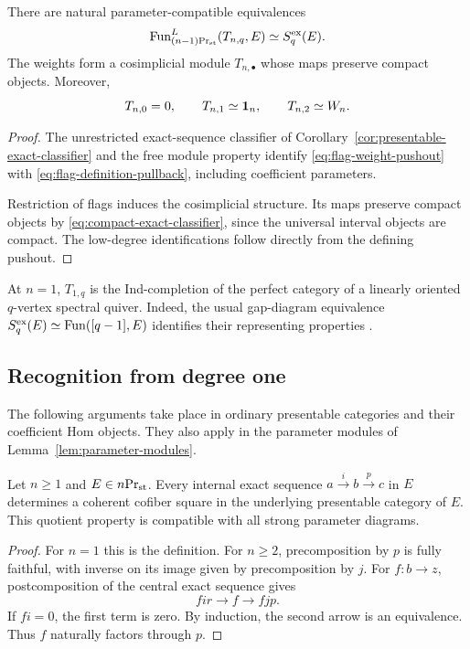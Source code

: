 \begin{proposition}\label{prop:flag-weight-up}
There are natural parameter-compatible equivalences
\begin{equation}\label{eq:flag-weight-up}
 \operatorname{Fun}^L_{{(n-1)}\mathrm{Pr}_{\mathrm{st}}}(T_{n,q},E)
       \simeq S_q^{\mathrm{ex}}(E).
\end{equation}
The weights form a cosimplicial module $T_{n,\bullet}$ whose maps
preserve compact objects. Moreover,
\[
 T_{n,0}=0,\qquad T_{n,1}\simeq\mathbf 1_n,\qquad
 T_{n,2}\simeq W_n.
\]
\end{proposition}


\begin{proof}
The unrestricted exact-sequence classifier
of Corollary~\ref{cor:presentable-exact-classifier}
and the free module property identify
\eqref{eq:flag-weight-pushout} with
\eqref{eq:flag-definition-pullback},
including coefficient parameters.

Restriction of flags induces the cosimplicial
structure. Its maps preserve compact objects
by \eqref{eq:compact-exact-classifier},
since the universal interval objects are compact.
The low-degree identifications follow directly
from the defining pushout.
\end{proof}


At $n=1$, $T_{1,q}$ is the Ind-completion of the perfect category of
a linearly oriented $q$-vertex spectral quiver. Indeed, the usual
gap-diagram equivalence
$S_q^{\mathrm{ex}}(E)\simeq\operatorname{Fun}([q-1],E)$ identifies their representing
properties \citep{Waldhausen}.

\subsection{Recognition from degree one}

The following arguments take place in ordinary presentable categories
and their coefficient Hom objects. They also apply in the parameter
modules of Lemma~\ref{lem:parameter-modules}.


\begin{lemma}\label{lem:exact-row-cofiber}
Let $n\geq 1$ and $E\in{n}\mathrm{Pr}_{\mathrm{st}}$.
Every internal exact sequence
\(a\xrightarrow{i}b\xrightarrow{p}c\)
in $E$ determines a coherent cofiber square in the underlying presentable category of $E$.
This quotient property is compatible with all strong
parameter diagrams.
\end{lemma}

\begin{proof}
For $n=1$ this is the definition. For $n\geq2$, precomposition by
$p$ is fully faithful, with inverse on its image given by
precomposition by $j$. For $f:b\to z$, postcomposition of the central
exact sequence gives
\[
 fir\longrightarrow f\longrightarrow fjp.
\]
If $fi=0$, the first term is zero.
By induction, the second arrow is an
equivalence.
Thus \(f\) naturally factors through \(p\).
\end{proof}


